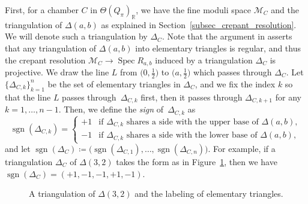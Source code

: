 \documentclass[10pt,a4paper]{amsart}
\numberwithin{equation}{section}
\theoremstyle{definition}
\newcommand{\RR}{\mathbb{R}}
\newcommand{\calM}{\mathcal{M}}
\newcommand{\Spec}{\operatorname{Spec}}
\newcommand{\sgn}{\operatorname{sgn}}
\newcommand{\perm}{\pi}
\begin{document}
First, for a chamber $C$ in $\Theta(Q_\perm)_\RR$, we have the fine moduli space $\calM_C$
and the triangulation of $\Delta(a,b)$ as explained in Section~\ref{subsec_crepant_resolution}. We will denote such a triangulation by $\Delta_C$.
Note that the argument in \cite[Section~3]{dais2001all} asserts that any triangulation of $\Delta(a,b)$ into elementary triangles is regular,
and thus the crepant resolution $\calM_C\to \Spec R_{a,b}$ induced by a triangulation $\Delta_C$ is projective.
We draw the line $L$ from $\bigl(0,\frac{1}{2}\bigr)$ to $\bigl(a,\frac{1}{2}\bigr)$ which passes through $\Delta_C$.
Let $\{\Delta_{C,k}\}_{k=1}^n$ be the set of elementary triangles in $\Delta_C$,
and we fix the index $k$ so that the line $L$ passes through~$\Delta_{C,k}$ first, then it passes through $\Delta_{C,k+1}$ for any $k=1, \dots, n-1$.
Then, we define the \emph{sign} of~$\Delta_{C,k}$ as
\[
\sgn(\Delta_{C,k})=
\begin{cases}
+1 & \text{if $\Delta_{C,k}$ shares a side with the upper base of $\Delta(a,b)$},\\
-1 & \text{if $\Delta_{C,k}$ shares a side with the lower base of $\Delta(a,b)$},
\end{cases}
\]
and let $\sgn(\Delta_C)\coloneqq \big(\sgn(\Delta_{C,1}), \dots, \sgn(\Delta_{C,n})\big)$.
For example, if a triangulation $\Delta_C$ of $\Delta(3,2)$ takes the form as in Figure~\ref{fig_sgn_triangulation},
then we have $\sgn(\Delta_C)=(+1, -1, -1, +1, -1)$.

\begin{figure}[!ht]
\centering
{}
\vspace{-2mm}

\caption{A triangulation of $\Delta(3,2)$ and the labeling of elementary triangles.}
\label{fig_sgn_triangulation}
\end{figure}
\end{document}
